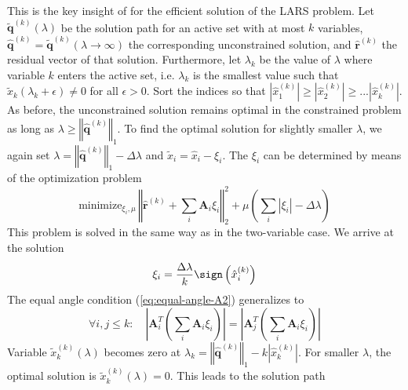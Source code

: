 This is the key insight of \cite{efron-04-least} for the efficient
solution of the LARS problem. Let $\mathbf{\tilde{q}}^{(k)}\left(\lambda\right)$
be the solution path for an active set with at most $k$ variables,
$\mathbf{\hat{q}}^{(k)}=\mathbf{\tilde{q}}^{(k)}\left(\lambda\rightarrow\infty\right)$
the corresponding unconstrained solution, and $\hat{\mathbf{r}}^{(k)}$
the residual vector of that solution. Furthermore, let $\lambda_{k}$
be the value of $\lambda$ where variable $k$ enters the active set,
i.e. $\lambda_{k}$ is the smallest value such that $\tilde{x}_{k}\left(\lambda_{k}+\epsilon\right)\ne0$
for all $\epsilon>0$. Sort the indices so that $\left|\hat{x}_{1}^{(k)}\right|\ge\left|\hat{x}_{2}^{(k)}\right|\ge...\left|\hat{x}_{k}^{(k)}\right|$.
As before, the unconstrained solution remains optimal in the constrained
problem as long as $\lambda\ge\left\Vert \hat{\mathbf{q}}^{(k)}\right\Vert _{1}$.
To find the optimal solution for slightly smaller $\lambda$, we again
set $\lambda=\left\Vert \hat{\mathbf{q}}^{(k)}\right\Vert _{1}-\Delta\lambda$
and $\tilde{x}_{i}=\hat{x}_{i}-\xi_{i}$. The $\xi_{i}$ can be determined
by means of the optimization problem 
\begin{equation}
\textrm{minimize}_{\xi_{i},\mu}\,\left\Vert \hat{\mathbf{r}}^{(k)}+\sum_{i}\mathbf{A}_{i}\xi_{i}\right\Vert _{2}^{2}+\mu\left(\sum_{i}\left|\xi_{i}\right|-\Delta\lambda\right)
\end{equation}
This problem is solved in the same way as in the two-variable case.
We arrive at the solution 
\begin{equation}
\xi_{i}=\frac{\Delta\lambda}{k}\sign\left(\hat{x}_{i}^{(k)}\right)
\end{equation}
The equal angle condition (\ref{eq:equal-angle-A2}) generalizes to
\begin{equation}
\forall i,j\le k:\quad\left|\mathbf{A}_{i}^{T}\left(\sum_{i}\mathbf{A}_{i}\xi_{i}\right)\right|=\left|\mathbf{A}_{j}^{T}\left(\sum_{i}\mathbf{A}_{i}\xi_{i}\right)\right|\label{eq:equal-angle}
\end{equation}
Variable $\tilde{x}_{k}^{(k)}\left(\lambda\right)$ becomes zero at
$\lambda_{k}=\left\Vert \hat{\mathbf{q}}^{(k)}\right\Vert _{1}-k\left|\hat{x}_{k}^{(k)}\right|$.
For smaller $\lambda$, the optimal solution is $\tilde{x}_{k}^{(k)}\left(\lambda\right)=0$.
This leads to the solution path
